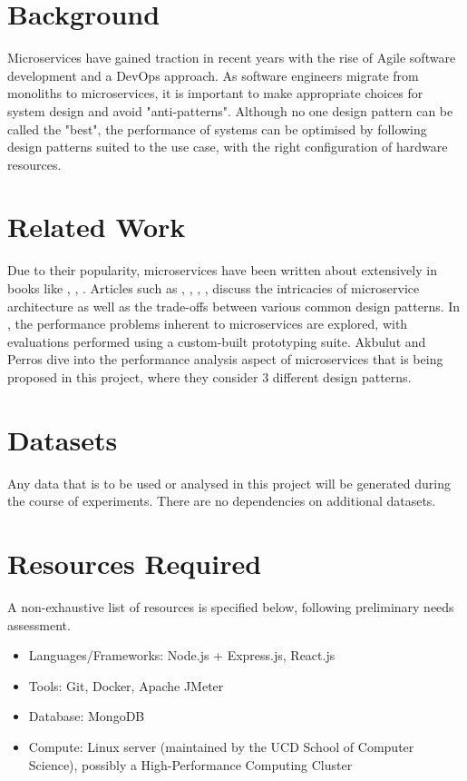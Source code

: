 \section{Background}
Microservices have gained traction in recent years with the rise of Agile software development and a DevOps \cite{awsDevOps} approach. As software engineers migrate from monoliths to microservices, it is important to make appropriate choices for system design and avoid "anti-patterns". Although no one design pattern can be called the "best", the performance of systems can be optimised by following design patterns suited to the use case, with the right configuration of hardware resources.

\section{Related Work}
Due to their popularity, microservices have been written about extensively in books like \cite{richardson18}, \cite{kleppmann17}, \cite{newman14}. Articles such as \cite{md19}, \cite{md20}, \cite{sahiti20}, \cite{udantha19}, \cite{fowler14} discuss the intricacies of microservice architecture as well as the trade-offs between various common design patterns. In \cite{cully20}, the performance problems inherent to microservices are explored, with evaluations performed using a custom-built prototyping suite. Akbulut and Perros \cite{akbulut19} dive into the performance analysis aspect of microservices that is being proposed in this project, where they consider 3 different design patterns.

\section{Datasets}
Any data that is to be used or analysed in this project will be generated during the course of experiments. There are no dependencies on additional datasets.

\section{Resources Required}

A non-exhaustive list of resources is specified below, following preliminary needs assessment.

\begin{itemize}
	\item Languages/Frameworks: Node.js + Express.js, React.js
	\item Tools: Git, Docker, Apache JMeter
	\item Database: MongoDB
	\item Compute: Linux server (maintained by the UCD School of Computer Science), possibly a High-Performance Computing Cluster
\end{itemize}

